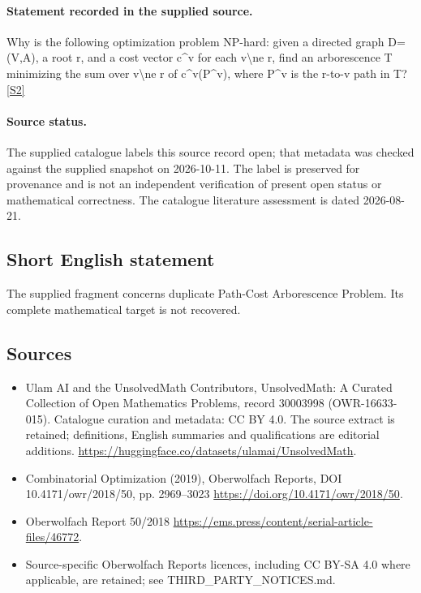 \documentclass[11pt]{article}
\newcommand{\sref}[2]{\hyperlink{source:#1:#2}{[S#2]}}
\begin{document}
\paragraph{Statement recorded in the supplied source.}
Why is the following optimization problem NP-hard: given a directed graph D=(V,A), a root r, and a cost vector c\textasciicircum{}v for each v\textbackslash{}ne r, find an arborescence T minimizing the sum over v\textbackslash{}ne r of c\textasciicircum{}v(P\textasciicircum{}v), where P\textasciicircum{}v is the r-to-v path in T? \sref{30003998}{2}
\paragraph{Source status.}
The supplied catalogue labels this source record open; that metadata was checked against the supplied snapshot on 2026-10-11. The label is preserved for provenance and is not an independent verification of present open status or mathematical correctness. The catalogue literature assessment is dated 2026-08-21.
\subsection{Short English statement}
The supplied fragment concerns duplicate Path-Cost Arborescence Problem. Its complete mathematical target is not recovered.
\subsection{Sources}
\begin{itemize}
\item[\hypertarget{source:30003998:1}{S1}] Ulam AI and the UnsolvedMath Contributors, UnsolvedMath: A Curated Collection of Open Mathematics Problems, record 30003998 (OWR-16633-015). Catalogue curation and metadata: CC BY 4.0. The source extract is retained; definitions, English summaries and qualifications are editorial additions.
\url{https://huggingface.co/datasets/ulamai/UnsolvedMath}.
\item[\hypertarget{source:30003998:2}{S2}] Combinatorial Optimization (2019), Oberwolfach Reports, DOI 10.4171/owr/2018/50, pp. 2969--3023
\url{https://doi.org/10.4171/owr/2018/50}.
\item[\hypertarget{source:30003998:3}{S3}] Oberwolfach Report 50/2018
\url{https://ems.press/content/serial-article-files/46772}.
\item Source-specific Oberwolfach Reports licences, including CC BY-SA 4.0 where applicable, are retained; see THIRD\_PARTY\_NOTICES.md.
\end{itemize}
\end{document}
